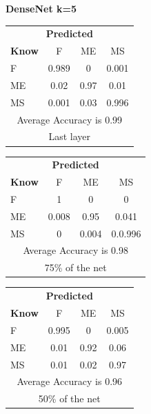 \documentclass[12pt]{article} %
\begin{document}
\begin{center}
\textbf{ DenseNet k=5}
\end{center}
\begin{minipage}{0.5\textwidth}
\begin{center}
\begin{tabular}{l|c|c|c|}
 \multicolumn{4}{c}{ \textbf{ Predicted}}\\
 \textbf{Know}&F&ME&MS\\ \hline\hline
F   &0.989&0&0.001\\
ME &0.02&0.97&0.01\\
MS &0.001&0.03&0.996\\
\multicolumn{4}{c}{Average Accuracy is 0.99}\\
\multicolumn{4}{c}{Last layer}\\
\end{tabular}
\end{center}
\end{minipage}
\begin{minipage}{0.5\textwidth}
\begin{center}
\begin{tabular}{l|c|c|c|}
 \multicolumn{4}{c}{ \textbf{ Predicted}}\\
 \textbf{Know}&F&ME&MS\\ \hline\hline
F   &1&0&0\\
ME &0.008&0.95&0.041\\
MS &0&0.004&0.0.996\\
\multicolumn{4}{c}{Average Accuracy is 0.98}\\
\multicolumn{4}{c}{75\%  of the net}\\
\end{tabular}
\end{center}
\end{minipage}
\begin{minipage}{0.5\textwidth}
\begin{center}
\begin{tabular}{l|c|c|c|}
 \multicolumn{4}{c}{ \textbf{ Predicted}}\\
 \textbf{Know}&F&ME&MS\\ \hline\hline
F   &0.995&0&0.005\\
ME &0.01&0.92&0.06\\
MS &0.01&0.02&0.97\\
\multicolumn{4}{c}{Average Accuracy is 0.96}\\
\multicolumn{4}{c}{50\%  of the net}\\
\end{tabular}
\end{center}
\end{minipage}
\end{document}
